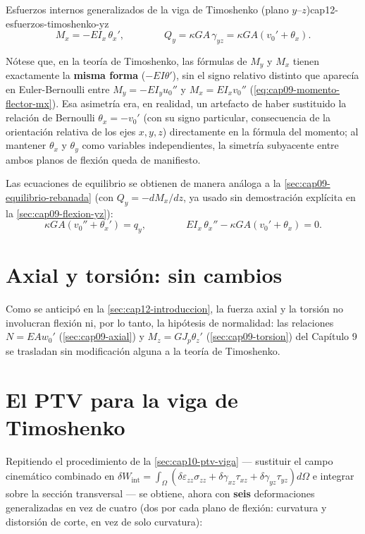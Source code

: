 \begin{ecnimportante}{Esfuerzos internos generalizados de la viga de Timoshenko (plano \texorpdfstring{$y$--$z$}{y-z})}{cap12-esfuerzos-timoshenko-yz}
\[
M_x = -EI_x\,\theta_x', \qquad\qquad Q_y = \kappa GA\,\gamma_{yz} = \kappa GA\left(v_0'+\theta_x\right) .
\]
\end{ecnimportante}

\begin{observacion}
Nótese que, en la teoría de Timoshenko, las fórmulas de $M_y$ y $M_x$ tienen exactamente la \textbf{misma forma} ($-EI\theta'$), sin el signo relativo distinto que aparecía en Euler-Bernoulli entre $M_y=-EI_yu_0''$ y $M_x=EI_xv_0''$ (\cref{eq:cap09-momento-flector-mx}). Esa asimetría era, en realidad, un artefacto de haber sustituido la relación de Bernoulli $\theta_x=-v_0'$ (con su signo particular, consecuencia de la orientación relativa de los ejes $x,y,z$) directamente en la fórmula del momento; al mantener $\theta_x$ y $\theta_y$ como variables independientes, la simetría subyacente entre ambos planos de flexión queda de manifiesto.
\end{observacion}

Las ecuaciones de equilibrio se obtienen de manera análoga a la \cref{sec:cap09-equilibrio-rebanada} (con $Q_y=-dM_x/dz$, ya usado sin demostración explícita en la \cref{sec:cap09-flexion-yz}):
\[
\kappa GA\left(v_0''+\theta_x'\right) = q_y , \qquad\qquad
EI_x\,\theta_x'' - \kappa GA\left(v_0'+\theta_x\right) = 0 .
\]

\section{Axial y torsión: sin cambios}

Como se anticipó en la \cref{sec:cap12-introduccion}, la fuerza axial y la torsión no involucran flexión ni, por lo tanto, la hipótesis de normalidad: las relaciones $N=EAw_0'$ (\cref{sec:cap09-axial}) y $M_z=GJ_p\theta_z'$ (\cref{sec:cap09-torsion}) del Capítulo 9 se trasladan sin modificación alguna a la teoría de Timoshenko.

\section{El PTV para la viga de Timoshenko}
\label{sec:cap12-ptv-timoshenko}

Repitiendo el procedimiento de la \cref{sec:cap10-ptv-viga} --- sustituir el campo cinemático combinado en $\delta W_{\text{int}}=\int_\Omega\left(\delta\varepsilon_{zz}\sigma_{zz}+\delta\gamma_{xz}\tau_{xz}+\delta\gamma_{yz}\tau_{yz}\right)d\Omega$ e integrar sobre la sección transversal --- se obtiene, ahora con \textbf{seis} deformaciones generalizadas en vez de cuatro (dos por cada plano de flexión: curvatura y distorsión de corte, en vez de solo curvatura):

